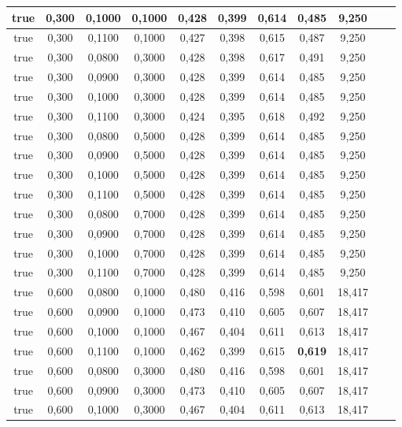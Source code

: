 \documentclass{article}
\begin{document}
\begin{longtable}[c]{|c|c|c|c|c|c|c|c|c|c|c|}
 true & 0,300 & 0,1000 & 0,1000 & 0,428 & 0,399 & 0,614 & 0,485 & 9,250  \\ \hline 
 true & 0,300 & 0,1100 & 0,1000 & 0,427 & 0,398 & 0,615 & 0,487 & 9,250  \\ \hline 
 true & 0,300 & 0,0800 & 0,3000 & 0,428 & 0,398 & 0,617 & 0,491 & 9,250  \\ \hline 
 true & 0,300 & 0,0900 & 0,3000 & 0,428 & 0,399 & 0,614 & 0,485 & 9,250  \\ \hline 
 true & 0,300 & 0,1000 & 0,3000 & 0,428 & 0,399 & 0,614 & 0,485 & 9,250  \\ \hline 
 true & 0,300 & 0,1100 & 0,3000 & 0,424 & 0,395 & 0,618 & 0,492 & 9,250  \\ \hline 
 true & 0,300 & 0,0800 & 0,5000 & 0,428 & 0,399 & 0,614 & 0,485 & 9,250  \\ \hline 
 true & 0,300 & 0,0900 & 0,5000 & 0,428 & 0,399 & 0,614 & 0,485 & 9,250  \\ \hline 
 true & 0,300 & 0,1000 & 0,5000 & 0,428 & 0,399 & 0,614 & 0,485 & 9,250  \\ \hline 
 true & 0,300 & 0,1100 & 0,5000 & 0,428 & 0,399 & 0,614 & 0,485 & 9,250  \\ \hline 
 true & 0,300 & 0,0800 & 0,7000 & 0,428 & 0,399 & 0,614 & 0,485 & 9,250  \\ \hline 
 true & 0,300 & 0,0900 & 0,7000 & 0,428 & 0,399 & 0,614 & 0,485 & 9,250  \\ \hline 
 true & 0,300 & 0,1000 & 0,7000 & 0,428 & 0,399 & 0,614 & 0,485 & 9,250  \\ \hline 
 true & 0,300 & 0,1100 & 0,7000 & 0,428 & 0,399 & 0,614 & 0,485 & 9,250  \\ \hline 
 true & 0,600 & 0,0800 & 0,1000 & 0,480 & 0,416 & 0,598 & 0,601 & 18,417  \\ \hline 
 true & 0,600 & 0,0900 & 0,1000 & 0,473 & 0,410 & 0,605 & 0,607 & 18,417  \\ \hline 
 true & 0,600 & 0,1000 & 0,1000 & 0,467 & 0,404 & 0,611 & 0,613 & 18,417  \\ \hline 
 true & 0,600 & 0,1100 & 0,1000 & 0,462 & 0,399 & 0,615 & \cellcolor{gray!20} \textbf{0,619} & 18,417  \\ \hline 
 true & 0,600 & 0,0800 & 0,3000 & 0,480 & 0,416 & 0,598 & 0,601 & 18,417  \\ \hline 
 true & 0,600 & 0,0900 & 0,3000 & 0,473 & 0,410 & 0,605 & 0,607 & 18,417  \\ \hline 
 true & 0,600 & 0,1000 & 0,3000 & 0,467 & 0,404 & 0,611 & 0,613 & 18,417  \\ \hline 

\end{longtable}
\end{document}
